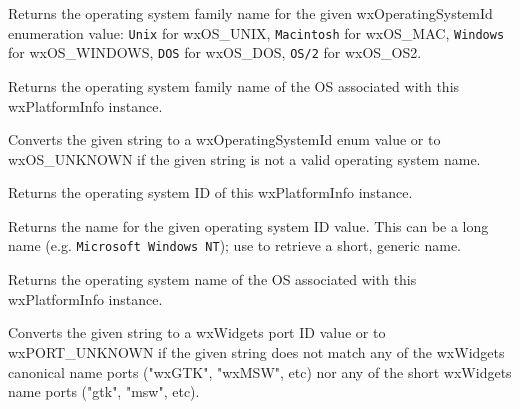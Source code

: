 
Returns the operating system family name for the given wxOperatingSystemId enumeration value:
{\tt Unix} for wxOS\_UNIX, {\tt Macintosh} for wxOS\_MAC, {\tt Windows} for wxOS\_WINDOWS,
{\tt DOS} for wxOS\_DOS, {\tt OS/2} for wxOS\_OS2.


Returns the operating system family name of the OS associated with this wxPlatformInfo instance.



\label{wxplatforminfogetoperatingsystemid}


Converts the given string to a wxOperatingSystemId enum value or to
wxOS\_UNKNOWN if the given string is not a valid operating system name.


Returns the operating system ID of this wxPlatformInfo instance.



\label{wxplatforminfogetoperatingsystemidname}


Returns the name for the given operating system ID value. This can be a long name
(e.g. {\tt Microsoft Windows NT}); use  to
retrieve a short, generic name.



Returns the operating system name of the OS associated with this wxPlatformInfo instance.





\label{wxplatforminfogetportid}


Converts the given string to a wxWidgets port ID value or to wxPORT\_UNKNOWN if
the given string does not match any of the wxWidgets canonical name ports ("wxGTK", "wxMSW", etc)
nor any of the short wxWidgets name ports ("gtk", "msw", etc).

